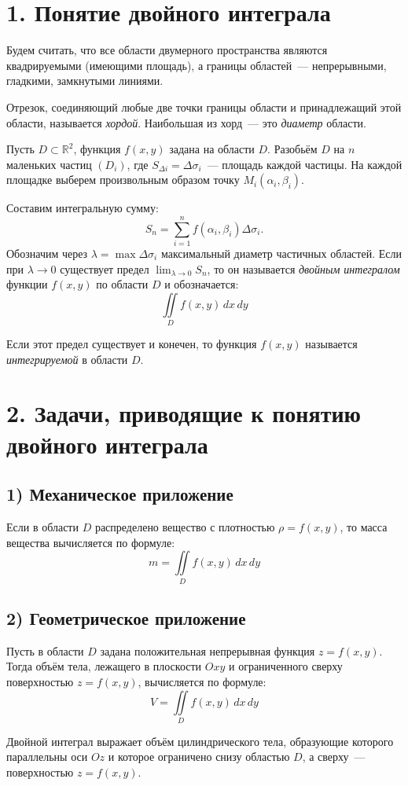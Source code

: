 \documentclass[17pt,a4paper]{extreport}
\begin{document}
\tableofcontents
\newpage

\section{1. Понятие двойного интеграла}

Будем считать, что все области двумерного пространства являются квадрируемыми (имеющими площадь), а границы областей~--- непрерывными, гладкими, замкнутыми линиями. 

Отрезок, соединяющий любые две точки границы области и принадлежащий этой области, называется \emph{хордой}. Наибольшая из хорд~--- это \emph{диаметр} области.

Пусть $D \subset \mathbb{R}^2$, функция $f(x,y)$ задана на области $D$. Разобьём $D$ на $n$ маленьких частиц $(D_i)$, где $S_{\Delta i} = \Delta \sigma_i$~--- площадь каждой частицы. На каждой площадке выберем произвольным образом точку $M_i (\alpha_i, \beta_i)$.

Составим интегральную сумму:
\[
S_n = \sum_{i=1}^{n} f(\alpha_i, \beta_i) \Delta \sigma_i.
\]
Обозначим через $\lambda = \max \Delta \sigma_i$ максимальный диаметр частичных областей. Если при $\lambda \to 0$ существует предел $\lim_{\lambda \to 0} S_n$, то он называется \emph{двойным интегралом} функции $f(x, y)$ по области $D$ и обозначается:
\[
\iint\limits_D f(x,y)\,dx\,dy
\]

Если этот предел существует и конечен, то функция $f(x,y)$ называется \emph{интегрируемой} в области $D$.

\newpage

\section{2. Задачи, приводящие к понятию двойного интеграла}

\subsection*{1) Механическое приложение}

Если в области $D$ распределено вещество с плотностью $\rho = f(x,y)$, то масса вещества вычисляется по формуле:
\[
m = \iint\limits_D f(x,y)\,dx\,dy
\]

\subsection*{2) Геометрическое приложение}

Пусть в области $D$ задана положительная непрерывная функция $z = f(x,y)$. Тогда объём тела, лежащего в плоскости $Oxy$ и ограниченного сверху поверхностью $z = f(x,y)$, вычисляется по формуле:
\[
V = \iint\limits_D f(x,y)\,dx\,dy
\]

Двойной интеграл выражает объём цилиндрического тела, образующие которого параллельны оси $Oz$ и которое ограничено снизу областью $D$, а сверху~--- поверхностью $z = f(x,y)$.
\end{document}
